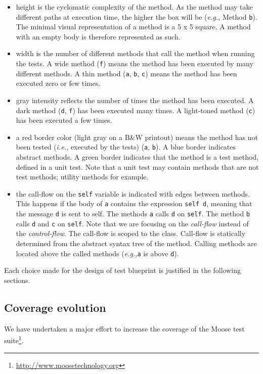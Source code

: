 \documentclass{sig-alternate}
\newcommand{\ct}{\lstinline[backgroundcolor=\color{white},basicstyle=\footnotesize\ttfamily]}
\newcommand{\ie}{\emph{i.e.,}\xspace}
\newcommand{\eg}{\emph{e.g.,}\xspace}
\newcommand{\secref}[1]{Section~\ref{sec:#1}}
\begin{document}
\begin{itemize}
\item height is the cyclomatic complexity of the method. As the method may take different paths at execution time, the higher the box will be (\eg Method \ct{b}). The minimal visual representation of a method is a 5 x 5 square. A method with an empty body is therefore represented as such.
\item width is the number of different methods that call the method when running the tests. A wide method (\ct{f}) means the method has been executed by many different methods. A thin method (\ct{a}, \ct{b}, \ct{c}) means the method has been executed zero or few times.
\item gray intensity reflects the number of times the method has been executed. A dark method (\ct{d}, \ct{f}) has been executed many times. A light-toned method (\ct{c}) has been executed a few times.
\item a red border color (light gray on a B\&W printout) means the method has not been tested (\ie executed by the tests) (\ct{a}, \ct{b}). A blue border indicates abstract methods. A green border indicates that the method is a test method, defined in a unit test. Note that a unit test may contain methods that are not test methods; utility methods for example.

\item the call-flow on the \ct{self} variable is indicated with edges between methods. This happens if the body of \ct{a} contains the expression \ct{self d}, meaning that the message \ct{d} is sent to self. The methods \ct{a} calls \ct{d} on \ct{self}. The method \ct{b} calls \ct{d} and \ct{c} on \ct{self}. Note that we are focusing on the \emph{call-flow} instead of the \emph{control-flow}. The call-flow is scoped to the class. Call-flow is statically determined from the abstract syntax tree of the method.  Calling methods are located above the called methods (\eg \ct{a} is above \ct{d}). 
\end{itemize}

Each choice made for the design of test blueprint is justified in the following sections. %

\subsection{Coverage evolution}

We have undertaken a major effort to increase the coverage of the Moose test suite\footnote{\url{http://www.moosetechnology.org}}. 
\end{document}
